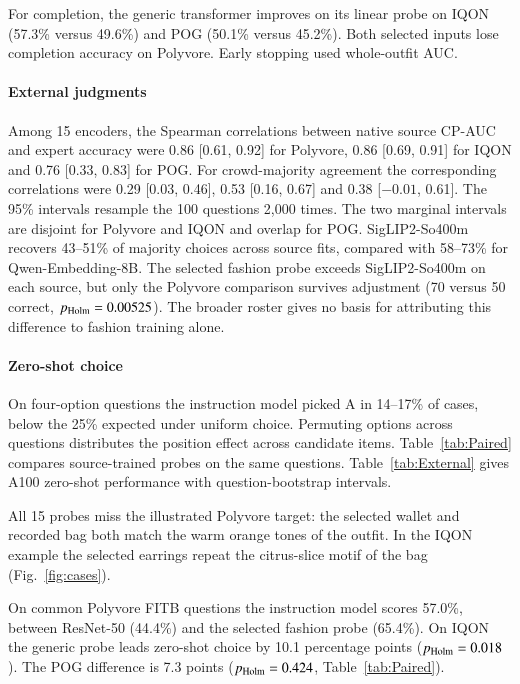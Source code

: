 For completion, the generic transformer improves on its linear probe on IQON (57.3\% versus 49.6\%) and POG (50.1\% versus 45.2\%). Both selected inputs lose completion accuracy on Polyvore. Early stopping used whole-outfit AUC.

\paragraph{External judgments}
Among 15 encoders, the Spearman correlations between native source CP-AUC and expert accuracy were 0.86 [0.61, 0.92] for Polyvore, 0.86 [0.69, 0.91] for IQON and 0.76 [0.33, 0.83] for POG. For crowd-majority agreement the corresponding correlations were 0.29 [0.03, 0.46], 0.53 [0.16, 0.67] and 0.38 [$-0.01$, 0.61]. The 95\% intervals resample the 100 questions 2,000 times. The two marginal intervals are disjoint for Polyvore and IQON and overlap for POG. SigLIP2-So400m recovers 43--51\% of majority choices across source fits, compared with 58--73\% for Qwen-Embedding-8B. The selected fashion probe exceeds SigLIP2-So400m on each source, but only the Polyvore comparison survives adjustment (70 versus 50 correct, $p_{\rm Holm}=0.00525$). The broader roster gives no basis for attributing this difference to fashion training alone.


\paragraph{Zero-shot choice}
On four-option questions the instruction model picked A in 14--17\% of cases, below the 25\% expected under uniform choice. Permuting options across questions distributes the position effect across candidate items. Table~\ref{tab:Paired} compares source-trained probes on the same questions. Table~\ref{tab:External} gives A100 zero-shot performance with question-bootstrap intervals.

All 15 probes miss the illustrated Polyvore target: the selected wallet and recorded bag both match the warm orange tones of the outfit. In the IQON example the selected earrings repeat the citrus-slice motif of the bag (Fig.~\ref{fig:cases}).

\showPaired
On common Polyvore FITB questions the instruction model scores 57.0\%, between ResNet-50 (44.4\%) and the selected fashion probe (65.4\%). On IQON the generic probe leads zero-shot choice by 10.1 percentage points ($p_{\rm Holm}=0.018$). The POG difference is 7.3 points ($p_{\rm Holm}=0.424$, Table~\ref{tab:Paired}).

